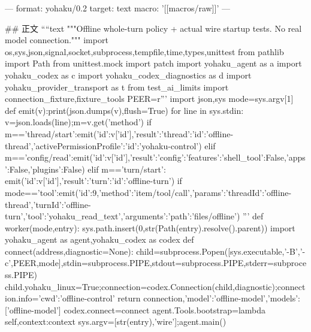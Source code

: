---
format: yohaku/0.2
target: text
macro: '[[macros/raw]]'
---

## 正文
````text
"""Offline whole-turn policy + actual wire startup tests. No real model connection."""
import os,sys,json,signal,socket,subprocess,tempfile,time,types,unittest
from pathlib import Path
from unittest.mock import patch
import yohaku_agent as a
import yohaku_codex as c
import yohaku_codex_diagnostics as d
import yohaku_provider_transport as t
from test_ai_limits import connection_fixture,fixture_tools
PEER=r'''
import json,sys
mode=sys.argv[1]
def emit(v):print(json.dumps(v),flush=True)
for line in sys.stdin:
 v=json.loads(line);m=v.get('method')
 if m=='thread/start':emit({'id':v['id'],'result':{'thread':{'id':'offline-thread'},'activePermissionProfile':{'id':'yohaku-control'}}})
 elif m=='config/read':emit({'id':v['id'],'result':{'config':{'features':{'shell_tool':False,'apps':False,'plugins':False}}}})
 elif m=='turn/start':
  emit({'id':v['id'],'result':{'turn':{'id':'offline-turn'}}})
  if mode=='tool':emit({'id':9,'method':'item/tool/call','params':{'threadId':'offline-thread','turnId':'offline-turn','tool':'yohaku_read_text','arguments':{'path':'files/offline'}}})
'''
def worker(mode,entry):
 sys.path.insert(0,str(Path(entry).resolve().parent))
 import yohaku_agent as agent,yohaku_codex as codex
 def connect(address,diagnostic=None):
  child=subprocess.Popen([sys.executable,'-B','-c',PEER,mode],stdin=subprocess.PIPE,stdout=subprocess.PIPE,stderr=subprocess.PIPE)
  child.yohaku_linux=True;connection=codex.Connection(child,diagnostic);connection.info={'cwd':'offline-control'}
  return connection,{'model':'offline-model','models':['offline-model']}
 codex.connect=connect
 agent.Tools.bootstrap=lambda self,context:context
 sys.argv=[str(entry),'wire'];agent.main()

